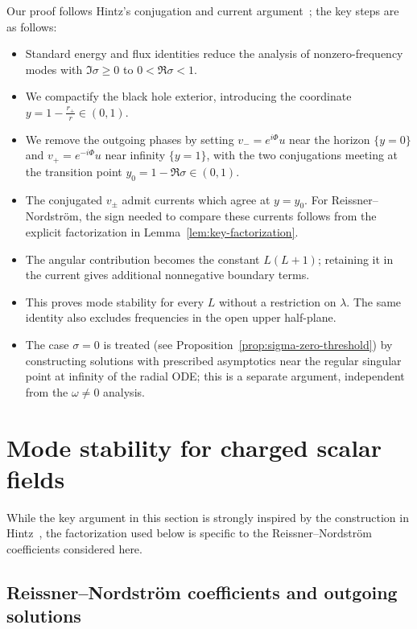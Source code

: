 \documentclass[11pt]{article}
\numberwithin{equation}{section}
\begin{document}
	Our proof follows Hintz's conjugation and current
	argument~\cite{HintzKdS2026}; the key steps are as follows: \begin{itemize}
		\item {Standard energy and flux identities reduce the analysis of nonzero-frequency modes with $\Im\sigma\ge0$ to $0<\Re\sigma<1$.}
		\item We compactify the black hole exterior, introducing the coordinate $y=1-\frac{r_+}{r} \in (0,1)$.
		\item  We remove the outgoing phases by setting $v_-=e^{i\Phi}u$ near
		the horizon $\{y=0\}$ and $v_+=e^{-i\Phi}u$ near infinity  $\{y=1\}$, with the two
		conjugations meeting at the transition point $y_0=1-\Re\sigma \in(0,1)$.
		\item  The conjugated $v_{\pm}$ admit currents which agree at $y=y_0$. For Reissner--Nordstr\"om, the sign
		needed to compare these currents follows from the explicit
		factorization in Lemma~\ref{lem:key-factorization}.
		\item The angular contribution becomes the constant $L(L+1)$; retaining
		it in the current gives additional nonnegative boundary terms.
		\item This proves mode stability for every $L$ without a restriction on
		$\lambda$. The same identity also excludes frequencies in the open
		upper half-plane.
		
		\item  The case $\sigma=0$ is treated (see 
		Proposition~\ref{prop:sigma-zero-threshold}) by  constructing  solutions with prescribed asymptotics near the regular singular point at infinity of the radial ODE; this is a separate argument, independent from the $\omega\neq 0 $ analysis.
	\end{itemize}
	
	
	
	
	
	\section{Mode stability for charged scalar fields}
	
	While the key argument in this section is strongly inspired by the 
	construction in Hintz~\cite{HintzKdS2026}, the factorization used below is specific to the
	Reissner--Nordstr\"om coefficients considered here.
	
	\subsection{Reissner--Nordstr\"om coefficients and outgoing solutions}
	
\end{document}
